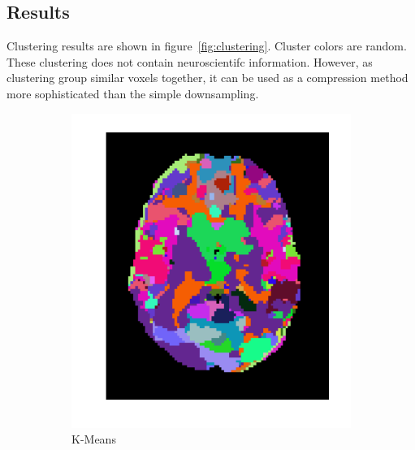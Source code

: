 \documentclass{frontiersSCNS} %
\begin{document}
\subsection{Results}

Clustering results are shown in figure~\ref{fig:clustering}. Cluster colors are
random. These clustering does not contain neuroscientifc information. However,
as clustering group similar voxels together, it can be used as a compression
method more sophisticated than the simple downsampling.

\begin{figure}[hbtp]
  \begin{center}
      \begin{subfigure}[b]{.23\linewidth}
          \includegraphics[width=\linewidth]{img/clustering/kmeans}
        \caption{K-Means}
      \end{subfigure}
      \begin{subfigure}[b]{.23\linewidth}

\end{subfigure}
\end{center}
\end{figure}
\end{document}
